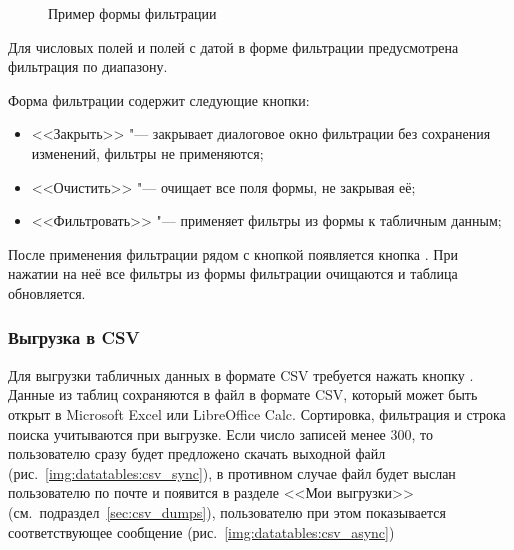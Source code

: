 \begin{figure}[H]
	\caption{Пример формы фильтрации}
	\label{img:datatables:filter_form}
\end{figure}

Для числовых полей и полей с датой в форме фильтрации предусмотрена фильтрация по диапазону.

Форма фильтрации содержит следующие кнопки:
\begin{itemize}
	\item <<Закрыть>> "--- закрывает диалоговое окно фильтрации без сохранения изменений, фильтры не применяются;
	\item <<Очистить>> "--- очищает все поля формы, не закрывая её;
	\item <<Фильтровать>> "--- применяет фильтры из формы к табличным данным;
\end{itemize}

После применения фильтрации рядом с кнопкой  появляется кнопка .
При нажатии на неё все фильтры из формы фильтрации очищаются и таблица обновляется. 

\subsubsection{Выгрузка в CSV}

Для выгрузки табличных данных в формате CSV требуется нажать кнопку . Данные из таблиц
сохраняются в файл в формате CSV, который может быть открыт в Microsoft Excel или LibreOffice Calc. Сортировка, фильтрация и строка
поиска учитываются при выгрузке. Если число записей менее 300, то пользователю сразу будет предложено скачать выходной файл 
(рис.~\ref{img:datatables:csv_sync}), в противном случае файл будет выслан пользователю по почте и появится в разделе <<Мои выгрузки>>
(см.\ подраздел~\ref{sec:csv_dumps}), пользователю при этом показывается соответствующее сообщение (рис.~\ref{img:datatables:csv_async})

